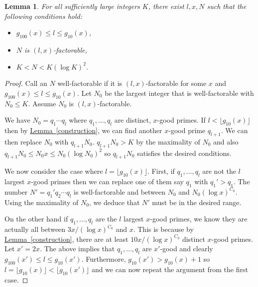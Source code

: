 \documentclass[11pt]{article}
\numberwithin{equation}{section}
\newtheorem{lemma}[theorem]{Lemma}
\theoremstyle{definition}
\theoremstyle{plain}
\newcommand{\expref}[2]{\hyperref[#2]{#1~\ref{#2}}}
\theoremstyle{definition}
\begin{document}
\begin{lemma}\label{scales}
For all sufficiently large integers $K$, there exist $l,x,N$ such that %
the following conditions hold:
\begin{itemize}
\item $g_{100}(x) \leq l \leq g_{10}(x)$,
\item $N$ is $(l,x)$-factorable,
\item$K < N < K (\log K)^2$.
\end{itemize}
%
%
\end{lemma}
\begin{proof}

Call an $N$ well-factorable if it is $(l,x)$-factorable for some $x$ and $g_{100}(x) \leq l \leq g_{10}(x)$.  Let $N_0$ be the largest integer that is well-factorable with $N_0 \leq K$.  %
Assume %
$N_0$ is $(l ,x)$-factorable.

We have $N_0 = q_1 \cdots q_l$ where $q_1, \dots , q_l$ are distinct, $x$-good primes.  If $l < \lfloor g_{10}(x) \rfloor$ then by \expref{Lemma}{construction}, we can find another $x$-good prime $q_{l+1}$.  We can then replace $N_0$ with $q_{l+1}N_0$.  $q_{l+1}N_0 > K$ by the maximality of $N_0$ and also $q_{l+1}N_0 \leq N_0x \leq N_0 (\log N_0)^2$ so $q_{l+1}N_0$ satisfies the desired 
%
conditions. %

We now consider the case where $l = \lfloor g_{10}(x) \rfloor$.  First, if $q_1, \dots , q_l$ are not the $l$ largest $x$-good primes then we can replace one of them say $q_1$ with $q_1'>q_1$.  The number $N' = q_1'q_2 \cdots q_l$ is well-factorable and between $N_0$ and $N_0(\log x)^{C_0}$.  Using the maximality of $N_0$, we deduce that $N'$ must be in the desired range.  

On the other hand if $q_1, \dots , q_l$ are the $l$ largest $x$-good primes, we know they are actually all between $3x/(\log x)^{C_0}$ and $x$.  This is because by \expref{Lemma}{construction}, there are at least $10x/(\log x)^{C_0}$ distinct $x$-good primes.  Let $x' = 2x$.  The above implies that $q_1, \dots , q_l$ are $x'$-good and clearly $g_{100}(x') \leq l \leq g_{10}(x')$.  Furthermore, $g_{10}(x') >g_{10}(x) + 1$ so $l = \lfloor g_{10}(x) \rfloor <  \lfloor g_{10}(x') \rfloor$ and we can now repeat the argument from the first case.
\end{proof}
\end{document}
